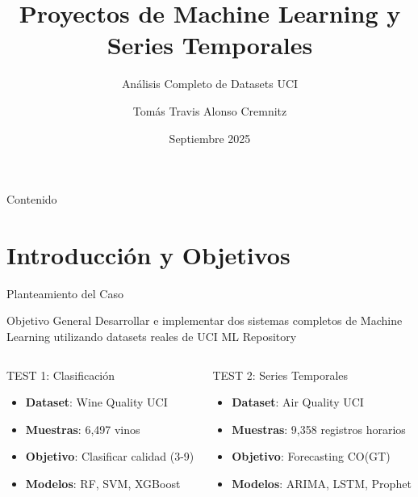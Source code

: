 \documentclass[aspectratio=169]{beamer}
\title[TTAC TestDataScience]{Proyectos de Machine Learning y Series Temporales}
\subtitle{Análisis Completo de Datasets UCI}
\author{Tomás Travis Alonso Cremnitz}
\date{Septiembre 2025}
\begin{document}
\begin{frame}
    \titlepage
\end{frame}

\begin{frame}{Contenido}
    \tableofcontents
\end{frame}

\section{Introducción y Objetivos}

\begin{frame}{Planteamiento del Caso}
    \begin{block}{Objetivo General}
        Desarrollar e implementar dos sistemas completos de Machine Learning utilizando datasets reales de UCI ML Repository
    \end{block}
    
    \vspace{0.5cm}
    
    \begin{columns}[T]
        \begin{column}{0.48\textwidth}
            \begin{alertblock}{TEST 1: Clasificación}
                \begin{itemize}
                    \item \textbf{Dataset}: Wine Quality UCI
                    \item \textbf{Muestras}: 6,497 vinos
                    \item \textbf{Objetivo}: Clasificar calidad (3-9)
                    \item \textbf{Modelos}: RF, SVM, XGBoost
                \end{itemize}
            \end{alertblock}
        \end{column}
        
        \begin{column}{0.48\textwidth}
            \begin{alertblock}{TEST 2: Series Temporales}
                \begin{itemize}
                    \item \textbf{Dataset}: Air Quality UCI
                    \item \textbf{Muestras}: 9,358 registros horarios
                    \item \textbf{Objetivo}: Forecasting CO(GT)
                    \item \textbf{Modelos}: ARIMA, LSTM, Prophet
                \end{itemize}
            \end{alertblock}
        \end{column}
    \end{columns}
\end{frame}
\end{document}
